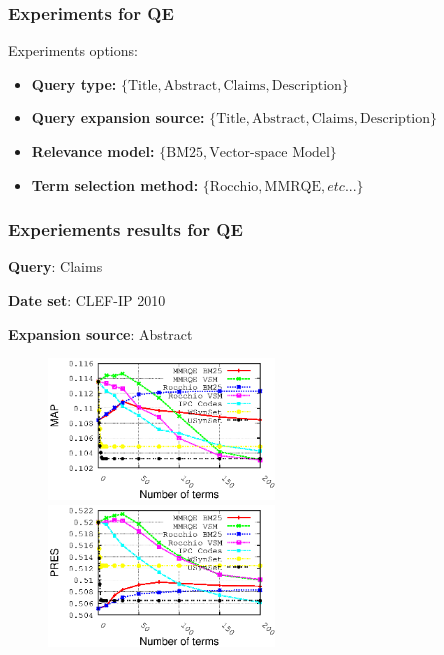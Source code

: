 \documentclass[xcolor=x11names,compress]{beamer}
\renewcommand{\(}{\begin{columns}}
\renewcommand{\)}{\end{columns}}
\newcommand{\<}[1]{\begin{column}{#1}}
\renewcommand{\>}{\end{column}}
\begin{document}
\begin{frame}
\frametitle{Experiments for QE}

Experiments options:

\begin{itemize}
\item \textbf{\footnotesize{}Query type:}{\footnotesize{} $\{\mathrm{Title},\mathrm{Abstract},\mathrm{Claims},\mathrm{Description}\}$ }{\footnotesize \par}
\item \textbf{\footnotesize{}Query expansion source:}{\footnotesize{} $\{\mathrm{Title},\mathrm{Abstract},\mathrm{Claims},\mathrm{Description}\}$ }{\footnotesize \par}
\item \textbf{\footnotesize{}Relevance model:}{\footnotesize{} $\{\mathrm{BM25},\mbox{Vector-space Model}\}$ }{\footnotesize \par}
\item \textbf{\footnotesize{}Term selection method:}{\footnotesize{} $\{\mathrm{Rocchio},\mathrm{MMRQE},etc...\}$ }{\footnotesize \par}
\end{itemize}
\end{frame}




\begin{frame}
\frametitle{Experiements results for QE}

\textbf{Query}: Claims 

\textbf{Date set}: CLEF-IP 2010 

\textbf{Expansion source}: Abstract 

\begin{figure}
\includegraphics[width=6cm]{../Results-CIKM2014/qClaims-sAbstract_MAP_2010}\includegraphics[width=6cm]{../Results-CIKM2014/qClaims-sAbstract_PRES_2010}
\end{figure}
\end{frame}
\end{document}
